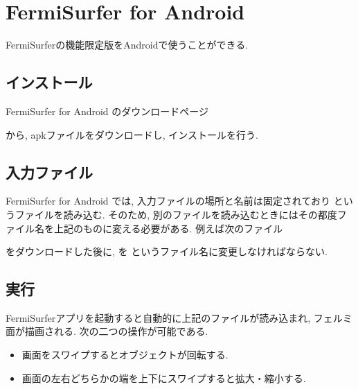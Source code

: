 \documentclass[letterpaper,10pt,dvipdfmx,openany]{sphinxmanual}
\begin{document}
\sphinxstepscope


\chapter{FermiSurfer for Android}
\label{\detokenize{android:fermisurfer-for-android}}\label{\detokenize{android::doc}}
\sphinxAtStartPar
FermiSurferの機能限定版をAndroidで使うことができる.


\section{インストール}
\label{\detokenize{android:id1}}
\sphinxAtStartPar
FermiSurfer for Android のダウンロードページ

\sphinxAtStartPar
{}

\sphinxAtStartPar
から, apkファイルをダウンロードし, インストールを行う.


\section{入力ファイル}
\label{\detokenize{android:id2}}
\sphinxAtStartPar
FermiSurfer for Android では, 入力ファイルの場所と名前は固定されており
 というファイルを読み込む.
そのため, 別のファイルを読み込むときにはその都度ファイル名を上記のものに変える必要がある.
例えば次のファイル

\sphinxAtStartPar
{}

\sphinxAtStartPar
をダウンロードした後に,  を  というファイル名に変更しなければならない.


\section{実行}
\label{\detokenize{android:id3}}
\sphinxAtStartPar
FermiSurferアプリを起動すると自動的に上記のファイルが読み込まれ, フェルミ面が描画される.
次の二つの操作が可能である.
\begin{itemize}
\item {} 
\sphinxAtStartPar
画面をスワイプするとオブジェクトが回転する.

\item {} 
\sphinxAtStartPar
画面の左右どちらかの端を上下にスワイプすると拡大・縮小する.

\end{itemize}
\end{document}
